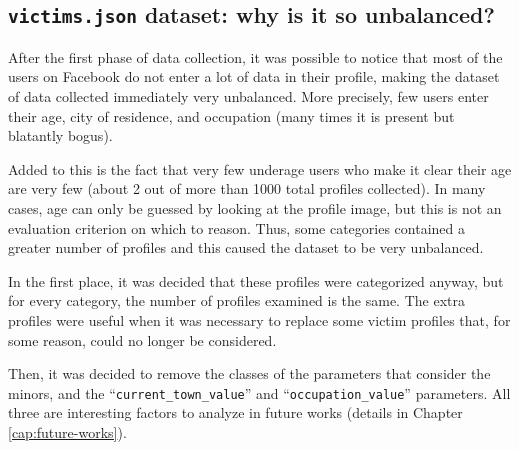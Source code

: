 \subsection{\texttt{victims.json} dataset: why is it so unbalanced?}
\label{cap:discuss-dataset-victims}
After the first phase of data collection, it was possible to notice that most of the users on Facebook do not enter a lot of data in their profile, making the dataset of data collected immediately very unbalanced. More precisely, few users enter their age, city of residence, and occupation (many times it is present but blatantly bogus).
\par \noindent Added to this is the fact that very few underage users who make it clear their age are very few (about 2 out of more than 1000 total profiles collected). In many cases, age can only be guessed by looking at the profile image, but this is not an evaluation criterion on which to reason. Thus, some categories contained a greater number of profiles and this caused the dataset to be very unbalanced.
\par \noindent In the first place, it was decided that these profiles were categorized anyway, but for every category, the number of profiles examined is the same. The extra profiles were useful when it was necessary to replace some victim profiles that, for some reason, could no longer be considered.
\par \noindent Then, it was decided to remove the classes of the parameters that consider the minors, and the ``\texttt{current\_town\_value}'' and ``\texttt{occupation\_value}'' parameters. All three are interesting factors to analyze in future works (details in Chapter \ref{cap:future-works}).
